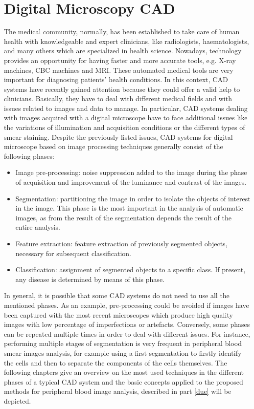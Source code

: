 \documentclass[final,a4paper,12pt,english]{UnicaPhdThesis3}
\begin{document}
\part{Digital Microscopy CAD} \label{uno}
The medical community, normally, has been established to take care of human health with knowledgeable and expert clinicians, like radiologists, haematologists, and many others which are specialized in health science. Nowadays, technology provides an opportunity for having faster and more accurate tools, e.g. X-ray machines, CBC machines and MRI. These automated medical tools are very important for diagnosing patients' health conditions. In this context, CAD systems have recently gained attention because they could offer a valid help to clinicians. Basically, they have to deal with different medical fields and with issues related to images and data to manage. In particular, CAD systems dealing with images acquired with a digital microscope have to face additional issues like the variations of illumination and acquisition conditions or the different types of smear staining. Despite the previously listed issues, CAD systems for digital microscope based on image processing techniques generally consist of the following phases:
\begin{itemize}
\item Image pre-processing: noise suppression added to the image during the phase of acquisition and improvement of the luminance and contrast of the images.
\item Segmentation: partitioning the image in order to isolate the objects of interest in the image. This phase is the most important in the analysis of automatic images, as from the result of the segmentation depends the result of the entire analysis.
\item Feature extraction: feature extraction of previously segmented objects, necessary for subsequent classification.
\item Classification: assignment of segmented objects to a specific class. If present, any disease is determined by means of this phase. 
\end{itemize}

In general, it is possible that some CAD systems do not need to use all the mentioned phases. As an example, pre-processing could be avoided if images have been captured with the most recent microscopes which produce high quality images with low percentage of imperfections or artefacts. Conversely, some phases can be repeated multiple times in order to deal with different issues. For instance, performing multiple stages of segmentation is very frequent in peripheral blood smear images analysis, for example using a first segmentation to firstly identify the cells and then to separate the components of the cells themselves. 
The following chapters give an overview on the most used techniques in the different phases of a typical CAD system and the basic concepts applied to the proposed methods for peripheral blood image analysis, described in part \ref{due} will be depicted.
\end{document}
